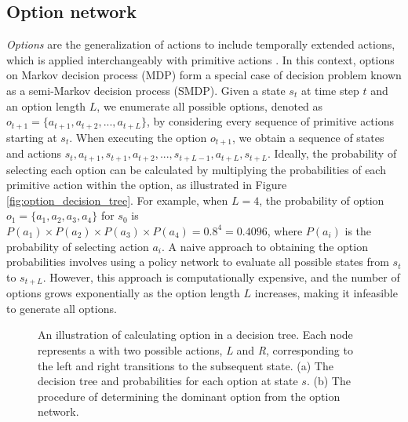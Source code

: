 \subsection{Option network}\label{sec:ozero-option_network}
\textit{Options} are the generalization of actions to include temporally extended actions, which is applied interchangeably with primitive actions \cite{sutton_mdps_1999,bacon_optioncritic_2017}.
In this context, options on Markov decision process (MDP) form a special case of decision problem known as a semi-Markov decision process (SMDP).
Given a state $s_t$ at time step $t$ and an option length $L$, we enumerate all possible options, denoted as $o_{t+1}=\{a_{t+1}, a_{t+2}, ..., a_{t+L}\}$, by considering every sequence of primitive actions starting at $s_t$.
When executing the option $o_{t+1}$, we obtain a sequence of states and actions $s_t, a_{t+1}, s_{t+1}, a_{t+2}, ..., s_{t+L-1}, a_{t+L}, s_{t+L}$.
Ideally, the probability of selecting each option can be calculated by multiplying the probabilities of each primitive action within the option, as illustrated in Figure \ref{fig:option_decision_tree}.
For example, when $L=4$, the probability of option $o_1=\{a_1, a_2, a_3, a_4\}$ for $s_0$ is $P(a_1)\times P(a_2)\times P(a_3)\times P(a_4)=0.8^4=0.4096$, where $P(a_i)$ is the probability of selecting action $a_i$.
A naive approach to obtaining the option probabilities involves using a policy network to evaluate all possible states from $s_t$ to $s_{t+L}$.
However, this approach is computationally expensive, and the number of options grows exponentially as the option length $L$ increases, making it infeasible to generate all options.

\begin{figure}[h]
    \centering
    \caption{An illustration of calculating option in a decision tree. Each node represents a with two possible actions, \textit{L} and \textit{R}, corresponding to the left and right transitions to the subsequent state. (a) The decision tree and probabilities for each option at state $s$. (b) The procedure of determining the dominant option from the option network.}
    \label{fig:option_prob}
\end{figure}

